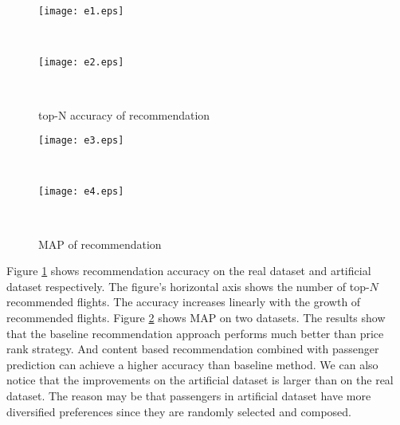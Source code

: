 \documentclass{llncs}
\begin{document}
\begin{figure}[!h]
              \begin{minipage}[t]{0.47\linewidth}
              \centering
              \texttt{[image: e1.eps]}\\
              \end{minipage}
              \begin{minipage}[t]{0.005\linewidth}~~~
              \end{minipage}
              \begin{minipage}[t]{0.47\linewidth}
              \centering
              \texttt{[image: e2.eps]}\\
              \end{minipage}
              \begin{minipage}[t]{0.005\linewidth}~~~
              \end{minipage}
              \caption{top-N accuracy of recommendation}
          \label{fig:top}
\end{figure}
\begin{figure}[!h]
              \begin{minipage}[t]{0.47\linewidth}
              \centering
              \texttt{[image: e3.eps]}\\
              \end{minipage}
              \begin{minipage}[t]{0.005\linewidth}~~~
              \end{minipage}
              \begin{minipage}[t]{0.47\linewidth}
              \centering
              \texttt{[image: e4.eps]}\\
              \end{minipage}
              \begin{minipage}[t]{0.005\linewidth}~~~
              \end{minipage}
              \caption{MAP of recommendation}
          \label{fig:rank}
\end{figure}\par
Figure \ref{fig:top} shows recommendation accuracy on the real dataset and artificial dataset respectively. The figure's horizontal axis shows the number of top-$N$ recommended flights. The accuracy increases linearly with the growth of recommended flights. Figure \ref{fig:rank} shows MAP on two datasets. The results show that the baseline recommendation approach performs much better than price rank strategy. And content based recommendation combined with passenger prediction can achieve a higher accuracy than baseline method. We can also notice that the improvements on the artificial dataset is larger than on the real dataset. The reason may be that passengers in artificial dataset have more diversified preferences since they are randomly selected and composed.
\end{document}
